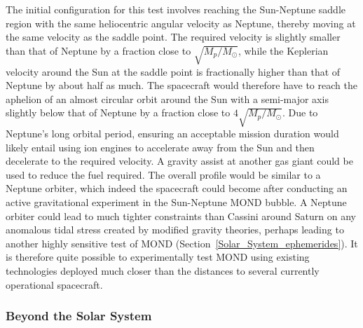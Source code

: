\documentclass[fleqn,usenatbib,useAMS]{mnras} %
\begin{document}
The initial configuration for this test involves reaching the Sun-Neptune saddle region with the same heliocentric angular velocity as Neptune, thereby moving at the same velocity as the saddle point. The required velocity is slightly smaller than that of Neptune by a fraction close to $\sqrt{M_p/M_\odot}$, while the Keplerian velocity around the Sun at the saddle point is fractionally higher than that of Neptune by about half as much. The spacecraft would therefore have to reach the aphelion of an almost circular orbit around the Sun with a semi-major axis slightly below that of Neptune by a fraction close to $4\sqrt{M_p/M_\odot}$. Due to Neptune's long orbital period, ensuring an acceptable mission duration would likely entail using ion engines to accelerate away from the Sun and then decelerate to the required velocity. A gravity assist at another gas giant could be used to reduce the fuel required. The overall profile would be similar to a Neptune orbiter, which indeed the spacecraft could become after conducting an active gravitational experiment in the Sun-Neptune MOND bubble. A Neptune orbiter could lead to much tighter constraints than Cassini around Saturn on any anomalous tidal stress created by modified gravity theories, perhaps leading to another highly sensitive test of MOND (Section~\ref{Solar_System_ephemerides}). It is therefore quite possible to experimentally test MOND using existing technologies deployed much closer than the distances to several currently operational spacecraft.


\subsubsection{Beyond the Solar System}
\label{Spacecraft_tests_beyond_Solar_System}
\end{document}
